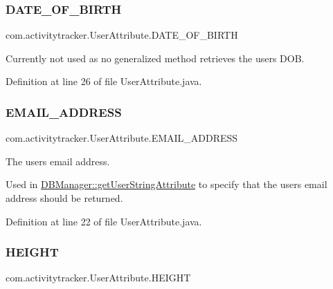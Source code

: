 \subsubsection{\texorpdfstring{D\+A\+T\+E\+\_\+\+O\+F\+\_\+\+B\+I\+R\+TH}{DATE\_OF\_BIRTH}}
{\footnotesize\ttfamily com.\+activitytracker.\+User\+Attribute.\+D\+A\+T\+E\+\_\+\+O\+F\+\_\+\+B\+I\+R\+TH}

Currently not used as no generalized method retrieves the user\textquotesingle{}s D\+OB. 

Definition at line 26 of file User\+Attribute.\+java.

\mbox{\label{enumcom_1_1activitytracker_1_1_user_attribute_a8b9fa2ebf911262dfa24c683ff2a3b9c}} 
\subsubsection{\texorpdfstring{E\+M\+A\+I\+L\+\_\+\+A\+D\+D\+R\+E\+SS}{EMAIL\_ADDRESS}}
{\footnotesize\ttfamily com.\+activitytracker.\+User\+Attribute.\+E\+M\+A\+I\+L\+\_\+\+A\+D\+D\+R\+E\+SS}

The user\textquotesingle{}s email address.

Used in \mbox{\hyperlink{classcom_1_1activitytracker_1_1_d_b_manager_a20f726c054d6c8a6fc3ce629d87f1114}{D\+B\+Manager\+::get\+User\+String\+Attribute}} to specify that the user\textquotesingle{}s email address should be returned. 

Definition at line 22 of file User\+Attribute.\+java.

\mbox{\label{enumcom_1_1activitytracker_1_1_user_attribute_a0a80ca5cce8eb4494c2128bd4291a5b7}} 
\subsubsection{\texorpdfstring{H\+E\+I\+G\+HT}{HEIGHT}}
{\footnotesize\ttfamily com.\+activitytracker.\+User\+Attribute.\+H\+E\+I\+G\+HT}

